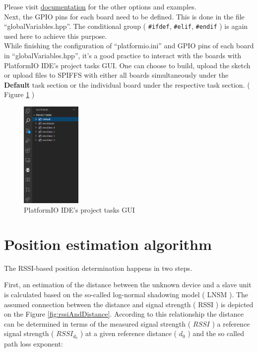 \documentclass[11pt,a4paper]{article}
\begin{document}
Please visit \href{https://docs.platformio.org/en/latest/projectconf/section_env.html#options}{documentation} for the other options and examples.\\

Next, the GPIO pins for each board need to be defined. This is done in the file ``globalVariables.hpp''. The conditional group ( \texttt{\#ifdef}, \texttt{\#elif}, \texttt{\#endif} ) is again used here to achieve this purpose.\\

While finishing the configuration of ``platformio.ini'' and GPIO pins of each board in ``globalVariables.hpp'', it's a good practice to interact with the boards with PlatformIO IDE's project tasks GUI. One can choose to build, upload the sketch or upload files to SPIFFS with either all boards simultaneously under the \textbf{Default} task section or the individual board under the respective task section. ( Figure \ref{fig:GUI} ) 

\begin{figure}[H]
    \centering
    \includegraphics[width = 0.26\textwidth]{figures/PlatformIOProjectTasksGUI.png}
    \caption{PlatformIO IDE's project tasks GUI}
    \label{fig:GUI}
\end{figure}


\newpage


\section{Position estimation algorithm}

The RSSI-based position determination happens in two steps.

First, an estimation of the distance between the unknown device and a slave unit is calculated based on the so-called log-normal shadowing model ( LNSM ). The assumed connection between the distance and signal strength ( RSSI ) is depicted on the Figure \ref{fig:rssiAndDistance}. According to this relationship the distance can be determined \cite{BottaSimek} in terms of the measured signal strength ( $RSSI$ ) a reference signal strength ( $RSSI_{d_0}$ ) at a given reference distance ( $d_0$ ) and the so called path loss exponent:\\
\end{document}
